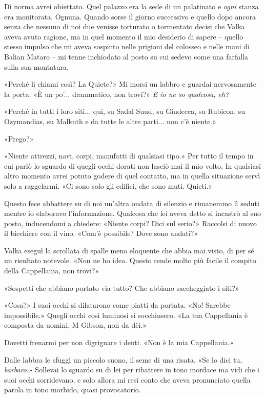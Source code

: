 Di norma avrei obiettato. Quel palazzo era la sede di un palatinato e
\emph{ogni} stanza era monitorata. Ognuna. Quando sorse il giorno
successivo e quello dopo ancora senza che nessuno di noi due venisse
torturato o tormentato decisi che Valka aveva avuto ragione, ma in quel
momento il mio desiderio di sapere -- quello stesso impulso che mi aveva
sospinto nelle prigioni del colosseo e nelle mani di Balian Mataro -- mi
tenne inchiodato al posto su cui sedevo come una farfalla sulla sua
montatura.

«Perché li chiami così? La Quiete?» Mi morsi un labbro e guardai
nervosamente la porta. «È un po'... drammatico, non trovi?» \emph{E io
	ne so qualcosa, eh?}

«Perché in tutti i loro siti... qui, su Sadal Suud, su Giudecca, su
Rubicon, su Ozymandias, su Malkuth e da tutte le altre parti... non c'è
niente.»

«Prego?»

«Niente attrezzi, navi, corpi, manufatti di qualsiasi tipo.» Per tutto
il tempo in cui parlò lo sguardo di quegli occhi dorati non lasciò mai
il mio volto. In qualsiasi altro momento avrei potuto godere di quel
contatto, ma in quella situazione servì solo a raggelarmi. «Ci sono solo
gli edifici, che sono muti. Quieti.»

Questo fece abbattere su di noi un'altra ondata di silenzio e rimanemmo
lì seduti mentre io elaboravo l'informazione. Qualcosa che lei aveva
detto si incastrò al suo posto, inducendomi a chiedere: «Niente corpi?
Dici sul serio?» Raccolsi di nuovo il bicchiere con il vino. «Com'è
possibile? Dove sono andati?»

Valka eseguì la scrollata di spalle meno eloquente che abbia mai visto,
di per sé un risultato notevole. «Non ne ho idea. Questo rende molto più
facile il compito della Cappellania, non trovi?»

«Sospetti che abbiano portato via tutto? Che abbiano saccheggiato i
siti?»

«Cosa?» I suoi occhi si dilatarono come piatti da portata. «No! Sarebbe
impossibile.» Quegli occhi così luminosi si socchiusero. «La tua
Cappellania è composta da uomini, M Gibson, non da dèi.»

Dovetti frenarmi per non digrignare i denti. «Non è la mia Cappellania.»

Dalle labbra le sfuggì un piccolo suono, il seme di una risata. «Se lo
dici tu, \emph{barbaro}.» Sollevai lo sguardo su di lei per ribattere in
tono mordace ma vidi che i suoi occhi sorridevano, e solo allora mi resi
conto che aveva pronunciato quella parola in tono morbido, quasi
provocatorio.

